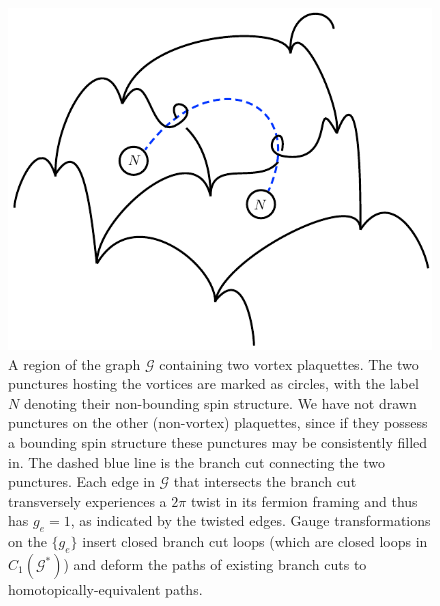 \documentclass[12pt,a4paper]{article}
\newcommand{\mcg}{\mathcal{G}}
\begin{document}
\begin{figure}
\begin{center}
\includegraphics{lattice_w_vortices.pdf}
\caption{\label{lattice_w_vortices} A region of the graph $\mcg$ containing two vortex plaquettes. 
The two punctures hosting the vortices are marked as circles, with the label $N$ denoting their non-bounding spin structure. 
We have not drawn punctures on the other (non-vortex) plaquettes, since if they possess a bounding spin structure these punctures may be consistently filled in.
The dashed blue line is the branch cut connecting the two punctures.
Each edge in $\mcg$ that intersects the branch cut transversely experiences a $2\pi$ twist in its fermion framing and thus has $g_e=1$, as indicated by the twisted edges.
Gauge transformations on the $\{g_e\}$ insert closed branch cut loops (which are closed loops in $C_1(\mcg^*)$) and deform the paths of existing branch cuts to homotopically-equivalent paths.}
\end{center}
\end{figure}
\end{document}

